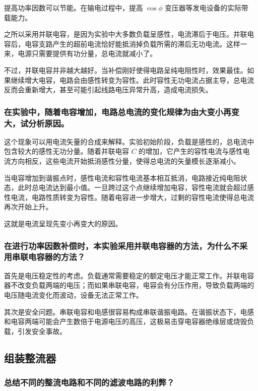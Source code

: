\documentclass{../../templates/Report}%
\begin{document}
\begin{fullreportonly}
    提高功率因数可以节能。在输电过程中，提高 $\cos\phi$ 变压器等发电设备的实际带载能力。

    之所以采用并联电容，是因为实验中大多数负载呈感性，电流滞后于电压。并联电容后，电容支路产生的超前电流恰好能抵消掉负载所需的滞后无功电流。这样一来，电源只需要提供有功分量，总电流就减小了。

    不过，并联电容并非越大越好。当补偿刚好使得电路呈纯电阻性时，效果最佳。如果继续增大电容，电路会由感性转变为容性。此时容性无功电流占据主导，总电流反而会重新增大，甚至可能引起线路电压异常升高，造成电流损失。

    \subsubsection{在实验中，随着电容增加，电路总电流的变化规律为由大变小再变大，试分析原因。}

    这个现象可以用电流矢量的合成来解释。实验初始阶段，负载是感性的，总电流中包含较大的感性无功分量。随着并联电容 $C$ 的增加，它产生的容性电流与感性电流方向相反，这些电流开始抵消感性分量，使得总电流的矢量模长逐渐减小。

    当电容增加到谐振点时，感性电流和容性电流基本相互抵消，电路接近纯电阻状态，此时总电流达到最小值。一旦跨过这个点继续增加电容，容性电流就会超过感性电流，电路性质转变为容性。随着电容进一步增大，过剩的容性电流使得总电流再次开始上升。

    这就是电流呈现先变小再变大的原因。

    \subsubsection{在进行功率因数补偿时，本实验采用并联电容器的方法，为什么不采用串联电容器的方法？}

    首先是电压稳定性的考虑。负载通常需要稳定的额定电压才能正常工作。并联电容器不改变负载两端的电压；而如果串联电容，电容会有分压作用，导致负载两端的电压随电流变化而波动，设备无法正常工作。

    其次是安全问题。串联电容和电感很容易构成串联谐振电路。在谐振状态下，电感和电容两端可能会产生数倍于电源电压的高压，这极易击穿电容器绝缘层或烧毁负载，引发安全事故。

    \subsection{组装整流器}

    \subsubsection{总结不同的整流电路和不同的滤波电路的利弊？}


\end{fullreportonly}
\end{document}
